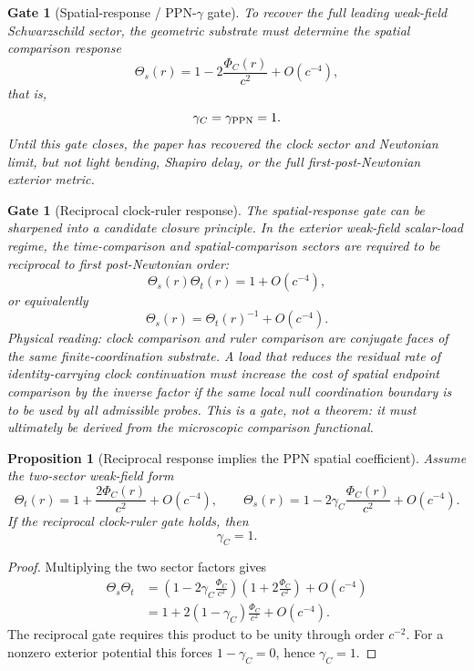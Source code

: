 \documentclass[11pt]{article}
\newtheorem{proposition}[theorem]{Proposition}
\newtheorem{gate}[theorem]{Gate}
\theoremstyle{remark}
\begin{document}
\begin{gate}[Spatial-response / PPN-\(\gamma\) gate]
\label{gate:spatial-response}
To recover the full leading weak-field Schwarzschild sector, the geometric substrate must determine the spatial comparison response
\[
        \Theta_s(r)=1-2\frac{\Phi_C(r)}{c^2}+O(c^{-4}),
\]
that is,
\[
        \gamma_C=\gamma_{\rm PPN}=1.
\]
Until this gate closes, the paper has recovered the clock sector and Newtonian limit, but not light bending, Shapiro delay, or the full first-post-Newtonian exterior metric.

\end{gate}

\begin{gate}[Reciprocal clock-ruler response]
\label{gate:reciprocal-clock-ruler}
The spatial-response gate can be sharpened into a candidate closure principle.  In the exterior weak-field scalar-load regime, the time-comparison and spatial-comparison sectors are required to be reciprocal to first post-Newtonian order:
\[
        \Theta_s(r)\Theta_t(r)=1+O(c^{-4}),
\]
or equivalently
\[
        \Theta_s(r)=\Theta_t(r)^{-1}+O(c^{-4}).
\]
Physical reading: clock comparison and ruler comparison are conjugate faces of the same finite-coordination substrate.  A load that reduces the residual rate of identity-carrying clock continuation must increase the cost of spatial endpoint comparison by the inverse factor if the same local null coordination boundary is to be used by all admissible probes.  This is a gate, not a theorem: it must ultimately be derived from the microscopic comparison functional.
\end{gate}

\begin{proposition}[Reciprocal response implies the PPN spatial coefficient]
\label{prop:reciprocal-implies-gamma}
Assume the two-sector weak-field form
\[
        \Theta_t(r)=1+\frac{2\Phi_C(r)}{c^2}+O(c^{-4}),
        \qquad
        \Theta_s(r)=1-2\gamma_C\frac{\Phi_C(r)}{c^2}+O(c^{-4}).
\]
If the reciprocal clock-ruler gate holds, then
\[
        \gamma_C=1.
\]
\end{proposition}

\begin{proof}
Multiplying the two sector factors gives
\[
\begin{aligned}
        \Theta_s\Theta_t
        &=\left(1-2\gamma_C\frac{\Phi_C}{c^2}\right)
          \left(1+2\frac{\Phi_C}{c^2}\right)+O(c^{-4})\\
        &=1+2(1-\gamma_C)\frac{\Phi_C}{c^2}+O(c^{-4}).
\end{aligned}
\]
The reciprocal gate requires this product to be unity through order \(c^{-2}\).  For a nonzero exterior potential this forces \(1-\gamma_C=0\), hence \(\gamma_C=1\).
\end{proof}
\end{document}
